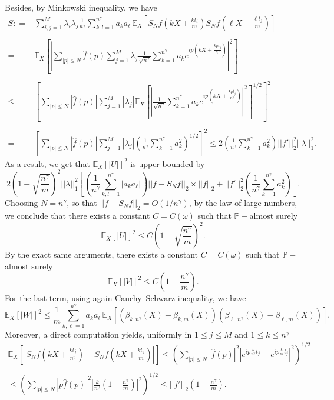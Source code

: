 \documentclass{svproc}
\newcommand \Esp {\mathbb{E}}
\begin{document}
Besides, by Minkowski inequality, we have 
\[
\begin{array}{rl}
S: = &\displaystyle{\sum_{i,j=1}^M \lambda_i \lambda_j \frac{1}{n^{\gamma}} \sum_{k,l=1}^{n^{\gamma}} a_k a_{\ell} \,  \mathbb E_X \left[ S_N f\left(kX+\frac{kt_i}{n^{\gamma}}\right)S_Nf\left(\ell X+\frac{\ell t_j}{n^{\gamma}}\right) \right]} \\
\\
 = &\displaystyle{  \mathbb E_X \left[\left|\sum_{|p| \leq N} \widehat{f}(p) \sum_{j=1}^M \lambda_j \frac{1}{\sqrt{n^{\gamma}}}  \sum_{k=1}^{n^{\gamma}} a_k e^{i p \left( kX+\frac{kp t_j}{n^{\gamma}}\right)} \right|^2 \right] }\\
 \\
  \leq  &\displaystyle{  \left[ \sum_{|p| \leq N} |\widehat{f}(p)| \sum_{j=1}^M |\lambda_j|  \mathbb E_X \left[ \left| \frac{1}{\sqrt{n^{\gamma}}}  \sum_{k=1}^{n^{\gamma}} a_k e^{i p \left( kX+\frac{kp t_j}{n^{\gamma}}\right)} \right|^2\right]^{1/2} \right]^2 }\\
  \\
   =  &\displaystyle{  \left[ \sum_{|p| \leq N} |\widehat{f}(p)| \sum_{j=1}^M |\lambda_j|   \left( \frac{1}{n^{\gamma}}  \sum_{k=1}^{n^{\gamma}} a_k^2\right)^{1/2} \right]^2 } \leq 2 \left( \frac{1}{n^{\gamma}}  \sum_{k=1}^{n^{\gamma}} a_k^2\right) ||f'||_2^2 ||\lambda||_1^2.
\end{array}
\]
As a result, we get that $\Esp_X [|U|]^2$ is upper bounded by 
\[
2\left(1-\sqrt{\frac{n^{\gamma}}{m}}\right)^2 ||\lambda||_1^2
\left[  \left( \frac{1}{n^{\gamma}} \sum_{k,l=1}^{n^{\gamma}} |a_k a_{\ell}|\right)  ||f-S_N  f||_2 \times ||f||_2 +  || f'||_2^2\left( \frac{1}{n^{\gamma}}  \sum_{k=1}^{n^{\gamma}} a_k^2\right)\right].
\]
Choosing $N=n^{\gamma}$, so that $||f-S_N  f||_2 =O(1/n^{\gamma})$, by the law of large numbers, we conclude that there exists a constant $C=C(\omega)$ such that $\mathbb P-$almost surely 
\[
\Esp_X [|U|]^2 \leq C \left(1-\sqrt{\frac{n^{\gamma}}{m}}\right)^2.
\]
By the exact same arguments,  there exists a constant $C=C(\omega)$ such that $\mathbb P-$almost surely 
\[
\Esp_X [|V|]^2 \leq C \left(1-\frac{n^{\gamma}}{m} \right).
\]
For the last term, using again Cauchy--Schwarz inequality, we have 
\[
\Esp_X [|W|]^2  \displaystyle{\leq \frac{1}{m} \sum_{k,\ell=1}^{n^{\gamma}} a_k a_{\ell} \, \mathbb E_X [(\beta_{k,n^{\gamma}}(X)-\beta_{k,m}(X) )(\beta_{\ell,n^{\gamma}}(X)-\beta_{\ell,m}(X))]}.
\]
Moreover, a direct computation yields, uniformly in $1 \leq j \leq M$ and $1 \leq k \leq n^{\gamma}$ 
\[
\begin{array}{ll}
\displaystyle{\mathbb E_X \left[\left|S_N f\left(kX+\frac{kt_j}{n^{\gamma}}\right)-S_N f\left(kX+\frac{kt_j}{m}\right) \right|\right] }\leq \displaystyle{\left( \sum_{|p|\leq N} |\widehat{f}(p)|^2 \left| e^{ip \frac{k }{n^{\gamma}}t_j} - e^{ip \frac{k }{m}t_j} \right|^2\right)^{1/2}}\\
\\
\leq \displaystyle{\left( \sum_{|p|\leq N} |p \widehat{f}(p)|^2 \left|  \frac{k}{n^{\gamma}} \left( 1-\frac{n^{\gamma}}{m}\right)\right|^2\right)^{1/2}\leq ||f'||_2   \left( 1-\frac{n^{\gamma}}{m}\right)}.
\end{array}
\]
\end{document}
